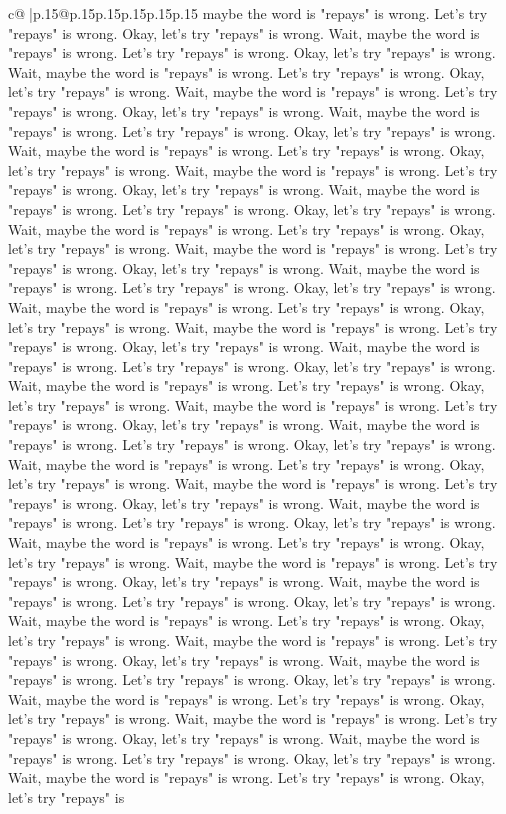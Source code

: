 \documentclass{article}
\begin{document}
{\begin{supertabular}{c@{$\;$}|p{.15\linewidth}@{}p{.15\linewidth}p{.15\linewidth}p{.15\linewidth}p{.15\linewidth}p{.15\linewidth}}
{{{maybe the word is "repays" is wrong. Let's try "repays" is wrong. Okay, let's try "repays" is wrong. Wait, maybe the word is "repays" is wrong. Let's try "repays" is wrong. Okay, let's try "repays" is wrong. Wait, maybe the word is "repays" is wrong. Let's try "repays" is wrong. Okay, let's try "repays" is wrong. Wait, maybe the word is "repays" is wrong. Let's try "repays" is wrong. Okay, let's try "repays" is wrong. Wait, maybe the word is "repays" is wrong. Let's try "repays" is wrong. Okay, let's try "repays" is wrong. Wait, maybe the word is "repays" is wrong. Let's try "repays" is wrong. Okay, let's try "repays" is wrong. Wait, maybe the word is "repays" is wrong. Let's try "repays" is wrong. Okay, let's try "repays" is wrong. Wait, maybe the word is "repays" is wrong. Let's try "repays" is wrong. Okay, let's try "repays" is wrong. Wait, maybe the word is "repays" is wrong. Let's try "repays" is wrong. Okay, let's try "repays" is wrong. Wait, maybe the word is "repays" is wrong. Let's try "repays" is wrong. Okay, let's try "repays" is wrong. Wait, maybe the word is "repays" is wrong. Let's try "repays" is wrong. Okay, let's try "repays" is wrong. Wait, maybe the word is "repays" is wrong. Let's try "repays" is wrong. Okay, let's try "repays" is wrong. Wait, maybe the word is "repays" is wrong. Let's try "repays" is wrong. Okay, let's try "repays" is wrong. Wait, maybe the word is "repays" is wrong. Let's try "repays" is wrong. Okay, let's try "repays" is wrong. Wait, maybe the word is "repays" is wrong. Let's try "repays" is wrong. Okay, let's try "repays" is wrong. Wait, maybe the word is "repays" is wrong. Let's try "repays" is wrong. Okay, let's try "repays" is wrong. Wait, maybe the word is "repays" is wrong. Let's try "repays" is wrong. Okay, let's try "repays" is wrong. Wait, maybe the word is "repays" is wrong. Let's try "repays" is wrong. Okay, let's try "repays" is wrong. Wait, maybe the word is "repays" is wrong. Let's try "repays" is wrong. Okay, let's try "repays" is wrong. Wait, maybe the word is "repays" is wrong. Let's try "repays" is wrong. Okay, let's try "repays" is wrong. Wait, maybe the word is "repays" is wrong. Let's try "repays" is wrong. Okay, let's try "repays" is wrong. Wait, maybe the word is "repays" is wrong. Let's try "repays" is wrong. Okay, let's try "repays" is wrong. Wait, maybe the word is "repays" is wrong. Let's try "repays" is wrong. Okay, let's try "repays" is wrong. Wait, maybe the word is "repays" is wrong. Let's try "repays" is wrong. Okay, let's try "repays" is wrong. Wait, maybe the word is "repays" is wrong. Let's try "repays" is wrong. Okay, let's try "repays" is wrong. Wait, maybe the word is "repays" is wrong. Let's try "repays" is wrong. Okay, let's try "repays" is wrong. Wait, maybe the word is "repays" is wrong. Let's try "repays" is wrong. Okay, let's try "repays" is wrong. Wait, maybe the word is "repays" is wrong. Let's try "repays" is wrong. Okay, let's try "repays" is wrong. Wait, maybe the word is "repays" is wrong. Let's try "repays" is wrong. Okay, let's try "repays" is wrong. Wait, maybe the word is "repays" is wrong. Let's try "repays" is wrong. Okay, let's try "repays" is }}}
\end{supertabular}}
\end{document}
